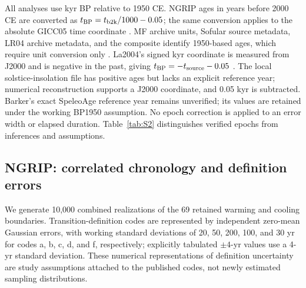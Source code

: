 \documentclass[11pt]{article}
\begin{document}
All analyses use kyr BP relative to 1950 CE. NGRIP ages in years before 2000 CE are converted as $t_{\rm BP}=t_{\rm b2k}/1000-0.05$; the same conversion applies to the absolute GICC05 time coordinate \citep{rasmussen2014stratigraphic,rasmussen2022gicc05,rasmussen2023ice}. MF archive units, Sofular source metadata, LR04 archive metadata, and the  composite identify 1950-based ages, which require unit conversion only \citep{fohlmeister2023mfData,held2024sofularData,lisiecki2005pliocene,bereiter2015revision}. La2004's signed kyr coordinate is measured from J2000 and is negative in the past, giving $t_{\rm BP}=-t_{\rm source}-0.05$ \citep{laskar2004long}. The local solstice-insolation file has positive ages but lacks an explicit reference year; numerical reconstruction supports a J2000 coordinate, and 0.05 kyr is subtracted. Barker's exact SpeleoAge reference year remains unverified; its values are retained under the working BP1950 assumption. No epoch correction is applied to an error width or elapsed duration. Table~\ref{tab:S2} distinguishes verified epochs from inferences and assumptions.

\subsection*{NGRIP: correlated chronology and definition errors}

We generate 10,000 combined realizations of the 69 retained warming and cooling boundaries. Transition-definition codes are represented by independent zero-mean Gaussian errors, with working standard deviations of 20, 50, 200, 100, and 30 yr for codes a, b, c, d, and f, respectively; explicitly tabulated $\pm4$-yr values use a 4-yr standard deviation. These numerical representations of definition uncertainty are study assumptions attached to the published codes, not newly estimated sampling distributions.
\end{document}

